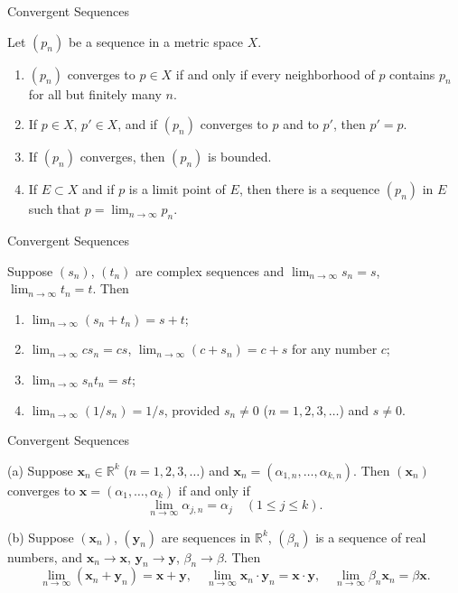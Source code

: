 \documentclass{beamer}
\begin{document}
\begin{frame}{Convergent Sequences}
\begin{theorem}
Let $(p_n)$ be a sequence in a metric space $X$.
\begin{enumerate}
    \item[(\textbf{a})] $(p_n)$ converges to $p \in X$ if and only if every
    neighborhood of $p$ contains $p_n$ for all but finitely many $n$.
    \item[(\textbf{b})] If $p \in X$, $p' \in X$, and if $(p_n)$ converges to
    $p$ and to $p'$, then $p' = p$.
    \item[(\textbf{c})] If $(p_n)$ converges, then $(p_n)$ is bounded.
    \item[(\textbf{d})] If $E \subset X$ and if $p$ is a limit point of $E$,
    then there is a sequence $(p_n)$ in $E$ such that $p = \lim_{n \to \infty}
    p_n$.
\end{enumerate}
\end{theorem}
\end{frame}
\begin{frame}{Convergent Sequences}
\begin{theorem}
Suppose $(s_n)$, $(t_n)$ are complex sequences and $\lim_{n \to \infty} s_n =
s$, $\lim_{n \to \infty} t_n = t$. Then
\begin{enumerate}
    \item[(\textbf{a})] $\lim_{n \to \infty} (s_n + t_n) = s + t$;
    \item[(\textbf{b})] $\lim_{n \to \infty} c s_n = c s$, $\lim_{n \to \infty}
    (c + s_n) = c + s$ for any number $c$;
    \item[(\textbf{c})] $\lim_{n \to \infty} s_n t_n = s t$;
    \item[(\textbf{d})] $\lim_{n \to \infty} (1/s_n) = 1/s$, provided $s_n \neq
    0$ ($n = 1, 2, 3, \dotsc$) and $s \neq 0$.
\end{enumerate}
\end{theorem}
\end{frame}

\begin{frame}{Convergent Sequences}
\begin{theorem}
(a) Suppose $\mathbf{x}_n \in \mathbb{R}^k$ ($n = 1, 2, 3, \dotsc$) and
$\mathbf{x}_n = (\alpha_{1,n}, \dotsc, \alpha_{k,n})$. Then $(\mathbf{x}_n)$
converges to $\mathbf{x} = (\alpha_1, \dotsc, \alpha_k)$ if and only if
\begin{equation}
 \lim_{n \to \infty} \alpha_{j,n} = \alpha_j \quad (1 \leq j \leq k).
\end{equation}



(b) Suppose $(\mathbf{x}_n)$, $(\mathbf{y}_n)$ are sequences in $\mathbb{R}^k$,
$(\beta_n)$ is a sequence of real numbers, and $\mathbf{x}_n \to \mathbf{x}$,
$\mathbf{y}_n \to \mathbf{y}$, $\beta_n \to \beta$. Then
\[
\lim_{n \to \infty} (\mathbf{x}_n + \mathbf{y}_n) = \mathbf{x} + \mathbf{y}, \quad 
\lim_{n \to \infty} \mathbf{x}_n \cdot \mathbf{y}_n = \mathbf{x} \cdot \mathbf{y}, \quad 
\lim_{n \to \infty} \beta_n \mathbf{x}_n = \beta \mathbf{x}.
\]
\end{theorem}
\end{frame}
\end{document}
